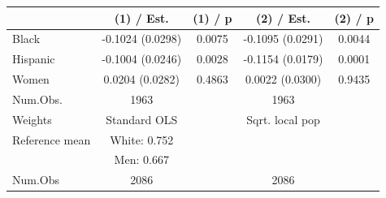 
\begin{tabular}[t]{lcccc}
\toprule
  & (1) / Est. & (1) / p & (2) / Est. & (2) / p\\
\midrule
Black & -0.1024 
(0.0298) & 0.0075 & -0.1095 
(0.0291) & 0.0044\\
Hispanic & -0.1004 
(0.0246) & 0.0028 & -0.1154 
(0.0179) & 0.0001\\
Women & 0.0204 
(0.0282) & 0.4863 & 0.0022 
(0.0300) & 0.9435\\
\midrule
Num.Obs. & 1963 &  & 1963 & \\
Weights & Standard OLS &  & Sqrt. local pop & \\
Reference mean & White: 0.752 &  &  & \\
 & Men: 0.667 &  &  & \\
Num.Obs & 2086 &  & 2086 & \\
\bottomrule
\end{tabular}
